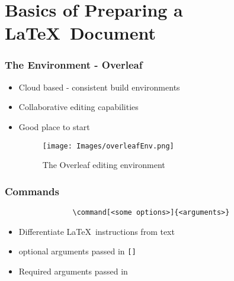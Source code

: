 \documentclass{beamer}
\begin{document}
    \section{Basics of Preparing a \LaTeX~Document}
        \begin{frame}
            \frametitle{The Environment - Overleaf}
            \begin{itemize}
                \item Cloud based - consistent build environments
                \item Collaborative editing capabilities
                \item Good place to start
                \begin{figure}
                    \begin{centering}
                        \texttt{[image: Images/overleafEnv.png]}
                        \caption{The Overleaf editing environment}
                        \label{fig:overleafEnv}
                    \end{centering}
                \end{figure}
            \end{itemize}
        \end{frame}
        \begin{frame}[fragile]
            \frametitle{Commands}
            \begin{verbatim}
                \command[<some options>]{<arguments>}
            \end{verbatim}
            \begin{itemize}
                \item Differentiate \LaTeX~instructions from text
                \item optional arguments passed in \texttt{[]}
                \item Required arguments passed in \texttt{{}}
            \end{itemize}
        \end{frame}
\end{document}
